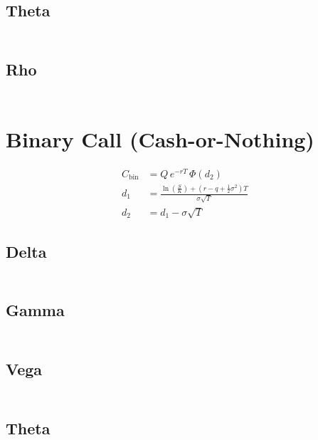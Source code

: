 \documentclass[12pt,a4paper]{article}
\begin{document}
\subsection{Theta}
\[
  \begin{aligned}
  \end{aligned}
\]

\subsection{Rho}
\[
  \begin{aligned}
  \end{aligned}
\]

\section{Binary Call (Cash-or-Nothing)}

\[
  \begin{aligned}
    C_{\mathrm{bin}} & = Q \, e^{-rT} \,\Phi(d_2)                                 \\ d_1 & = \frac{\ln\!
    \left(\tfrac{S}{K}\right) + (r - q + \tfrac{1}{2}\sigma^2)T}{\sigma \sqrt{T}} \\
    d_2              & = d_1 - \sigma \sqrt{T}
  \end{aligned}
\]

\subsection{Delta}
\[
  \begin{aligned}
  \end{aligned}
\]

\subsection{Gamma}
\[
  \begin{aligned}
  \end{aligned}
\]

\subsection{Vega}
\[
  \begin{aligned}
  \end{aligned}
\]

\subsection{Theta}
\[
  \begin{aligned}
  \end{aligned}
\]
\end{document}
